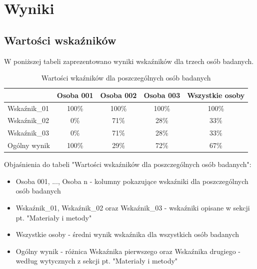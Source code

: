 \documentclass{article}
\begin{document}
\newpage
\section{Wyniki}
    \subsection{Wartości wskaźników}

    W poniższej tabeli zaprezentowano wyniki wskaźników dla trzech osób badanych. \\

    \begin{table}[H]
        \caption {Wartości wkaźników dla poszczególnych osób badanych}
        \begin{center}
            \begin{tabular}{| p{2.75cm} || c | c | c | c |}
                \hline
                 & Osoba 001 & Osoba 002 & Osoba 003 & Wszystkie osoby \\
                \hline
                \hline
                Wskaźnik\_01 & 100\% & 100\% & 100\% & 100\% \\
                \hline
                Wskaźnik\_02 &   0\% &  71\% &  28\% &  33\% \\
                \hline
                Wskaźnik\_03 &   0\% &  71\% &  28\% &  33\% \\
                \hline
                \hline
                Ogólny wynik & 100\% &  29\% &  72\% &  67\% \\
                \hline
            \end{tabular}
        \end{center}
    \end{table}

    Objaśnienia do tabeli "Wartości wskaźników dla poszczególnych osób badanych":
    \begin{itemize}
        \item Osoba 001, ..., Osoba n - kolumny pokazujące wskaźniki dla poszczególnych osób badanych
        \item Wskaźnik\_01, Wskaźnik\_02 oraz Wskaźnik\_03 - wskaźniki opisane w sekcji pt. "Materiały i metody"
        \item Wszystkie osoby - średni wynik wskaźnika dla wszystkich osób badanych
        \item Ogólny wynik - różnica Wskaźnika pierwszego oraz Wskaźnika drugiego - według wytycznych z sekcji pt. "Materiały i metody"
    \end{itemize}
\end{document}
